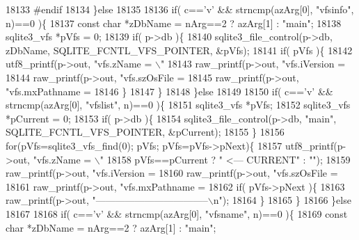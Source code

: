 \begin{DoxyCode}
{{{{{{{{{{{{{{{{{{{{{{{{{{{{{{{{{{{{{{{{{{{{{{{{{{{{{{{{{{{{{{{{{{{{{{{{{{{{{{{{{{{{{{{{{{{{{{{{{{{{{{{{{{{{{{{{{{{{{{{{{{{{{{{{{{{{{{{{{{{{{{{{{{{{{{{{{{{18133 \textcolor{preprocessor}{#endif}
18134   \}\textcolor{keywordflow}{else}
18135 
18136   \textcolor{keywordflow}{if}( c==\textcolor{charliteral}{'v'} && strncmp(azArg[0], \textcolor{stringliteral}{"vfsinfo"}, n)==0 )\{
18137     \textcolor{keyword}{const} \textcolor{keywordtype}{char} *zDbName = nArg==2 ? azArg[1] : \textcolor{stringliteral}{"main"};
18138     sqlite3_vfs *pVfs = 0;
18139     \textcolor{keywordflow}{if}( p->db )\{
18140       sqlite3_file_control(p->db, zDbName, SQLITE_FCNTL_VFS_POINTER, &pVfs);
18141       \textcolor{keywordflow}{if}( pVfs )\{
18142         utf8_printf(p->out, \textcolor{stringliteral}{"vfs.zName      = \(\backslash\)"%
18143         raw_printf(p->out, \textcolor{stringliteral}{"vfs.iVersion   = %
18144         raw_printf(p->out, \textcolor{stringliteral}{"vfs.szOsFile   = %
18145         raw_printf(p->out, \textcolor{stringliteral}{"vfs.mxPathname = %
18146       \}
18147     \}
18148   \}\textcolor{keywordflow}{else}
18149 
18150   \textcolor{keywordflow}{if}( c==\textcolor{charliteral}{'v'} && strncmp(azArg[0], \textcolor{stringliteral}{"vfslist"}, n)==0 )\{
18151     sqlite3_vfs *pVfs;
18152     sqlite3_vfs *pCurrent = 0;
18153     \textcolor{keywordflow}{if}( p->db )\{
18154       sqlite3_file_control(p->db, \textcolor{stringliteral}{"main"}, SQLITE_FCNTL_VFS_POINTER, &pCurrent);
18155     \}
18156     \textcolor{keywordflow}{for}(pVfs=sqlite3_vfs_find(0); pVfs; pVfs=pVfs->pNext)\{
18157       utf8_printf(p->out, \textcolor{stringliteral}{"vfs.zName      = \(\backslash\)"%
18158            pVfs==pCurrent ? \textcolor{stringliteral}{"  <--- CURRENT"} : \textcolor{stringliteral}{""});
18159       raw_printf(p->out, \textcolor{stringliteral}{"vfs.iVersion   = %
18160       raw_printf(p->out, \textcolor{stringliteral}{"vfs.szOsFile   = %
18161       raw_printf(p->out, \textcolor{stringliteral}{"vfs.mxPathname = %
18162       \textcolor{keywordflow}{if}( pVfs->pNext )\{
18163         raw_printf(p->out, \textcolor{stringliteral}{"-----------------------------------\(\backslash\)n"});
18164       \}
18165     \}
18166   \}\textcolor{keywordflow}{else}
18167 
18168   \textcolor{keywordflow}{if}( c==\textcolor{charliteral}{'v'} && strncmp(azArg[0], \textcolor{stringliteral}{"vfsname"}, n)==0 )\{
18169     \textcolor{keyword}{const} \textcolor{keywordtype}{char} *zDbName = nArg==2 ? azArg[1] : \textcolor{stringliteral}{"main"};
}}}}}}}}}}}}}}}}}}}}}}}}}}}}}}}}}}}}}}}}}}}}}}}}}}}}}}}}}}}}}}}}}}}}}}}}}}}}}}}}}}}}}}}}}}}}}}}}}}}}}}}}}}}}}}}}}}}}}}}}}}}}}}}}}}}}}}}}}}}}}}}}}}}}}}}}}}}}}}}}}}}
\end{DoxyCode}
